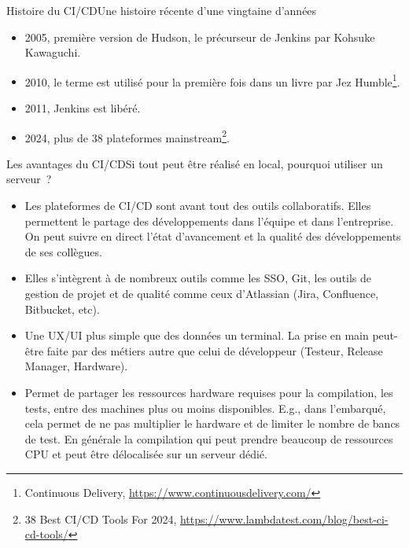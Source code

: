 \documentclass{beamer}
\begin{document}
    \begin{frame}{Histoire du CI/CD}{Une histoire récente d'une vingtaine d'années}
        \transdissolve
        \begin{itemize}
            \item 2005, première version de Hudson, le précurseur de Jenkins par Kohsuke Kawaguchi.
            \item 2010, le terme  est utilisé pour la première fois dans un livre par Jez Humble\footnote{\label{ci}Continuous Delivery, \url{https://www.continuousdelivery.com/}}.
            \item 2011, Jenkins est libéré.
            \item 2024, plus de 38 plateformes mainstream\footnote{38 Best CI/CD Tools For 2024, \url{https://www.lambdatest.com/blog/best-ci-cd-tools/}}.
        \end{itemize}
    \end{frame}

    \begin{frame}{Les avantages du CI/CD}{Si tout peut être réalisé en local, pourquoi utiliser un serveur~?}
        \transdissolve
        \begin{itemize}
            \item Les plateformes de CI/CD sont avant tout des outils collaboratifs.
            Elles permettent le partage des développements dans l'équipe et dans l'entreprise.
            On peut suivre en direct l'état d'avancement et la qualité des développements de ses collègues.
            \item Elles s'intègrent à de nombreux outils comme les SSO, Git, les outils de gestion de projet et de qualité comme ceux d'Atlassian (Jira, Confluence, Bitbucket, etc).
            \item Une UX/UI plus simple que des données un terminal.
            La prise en main peut-être faite par des métiers autre que celui de développeur (Testeur, Release Manager, Hardware).
            \item Permet de partager les ressources hardware requises pour la compilation, les tests, entre des machines plus ou moins disponibles.
            E.g., dans l'embarqué, cela permet de ne pas multiplier le hardware et de limiter le nombre de bancs de test.
            En générale la compilation qui peut prendre beaucoup de ressources CPU et peut être délocalisée sur un serveur dédié.
        \end{itemize}
    \end{frame}
\end{document}
